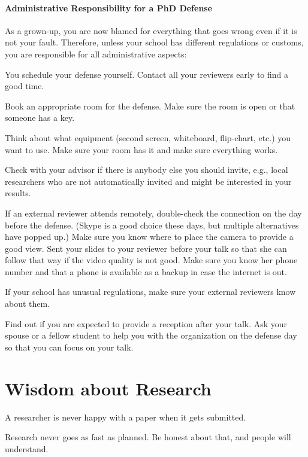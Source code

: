 \documentclass[12pt]{article}
\begin{document}
\paragraph{Administrative Responsibility for a PhD Defense}
As a grown-up, you are now blamed for everything that goes wrong even if it is not your fault.
Therefore, unless your school has different regulations or customs, you are responsible for all administrative aspects:
\begin{compactitem}
 \item You schedule your defense yourself. Contact all your reviewers early to find a good time.
 \item Book an appropriate room for the defense. Make sure the room is open or that someone has a key.
 \item Think about what equipment (second screen, whiteboard, flip-chart, etc.) you want to use.
   Make sure your room has it and make sure everything works.
 \item Check with your advisor if there is anybody else you should invite, e.g., local researchers who are not automatically invited and might be interested in your results.
 \item If an external reviewer attends remotely, double-check the connection on the day before the defense. (Skype is a good choice these days, but multiple alternatives have popped up.)
   Make sure you know where to place the camera to provide a good view.
   Sent your slides to your reviewer before your talk so that she can follow that way if the video quality is not good.
   Make sure you know her phone number and that a phone is available as a backup in case the internet is out.
 \item If your school has unusual regulations, make sure your external reviewers know about them.
 \item Find out if you are expected to provide a reception after your talk. Ask your spouse or a fellow student to help you with the organization on the defense day so that you can focus on your talk.
\end{compactitem}

\section{Wisdom about Research}

A researcher is never happy with a paper when it gets submitted.
\medskip

Research never goes as fast as planned. Be honest about that, and people will understand.
\medskip
\end{document}
